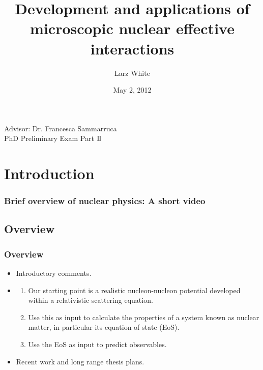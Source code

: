 \documentclass[10pt,serif]{beamer}
\title[Microscopic nuclear effective interactions\hspace{2em}\insertframenumber/
\inserttotalframenumber]{Development and applications of microscopic nuclear effective interactions}
\author{Larz White}
\institute{University of Idaho, Department of Physics}
\date{May 2, 2012}
\begin{document}
\begin{frame}
\titlepage
\scriptsize{Advisor: Dr. Francesca Sammarruca\\PhD Preliminary Exam Part $\mathrm{I{\hspace{-0.02cm}}I}$}
\end{frame} 
\section{Introduction}
\begin{frame}
\frametitle{Brief overview of nuclear physics: A short video}
\end{frame}
\subsection{Overview}
\begin{frame}
\frametitle{Overview}
\begin{itemize}
\item Introductory comments.
\item {}
\begin{enumerate}
\item Our starting point is a realistic nucleon-nucleon potential developed within a relativistic scattering equation.
\item Use this as input to calculate the properties of a system known as nuclear matter, in particular its equation of state (EoS).
\item Use the EoS as input to predict observables.
\end{enumerate}
\item Recent work and long range thesis plans.
\end{itemize}
\end{frame}
\end{document}
